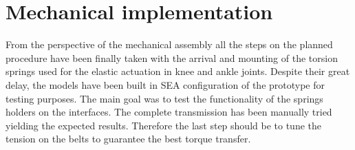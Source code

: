 \section{Mechanical implementation} %
\label{sec:mechanical_implementation}
From the perspective of the mechanical assembly all the steps on the planned procedure have been finally taken with the arrival and mounting of the torsion springs used for the elastic actuation in knee and ankle joints. 
Despite their great delay, the models 
have been built in SEA configuration of the prototype for testing purposes.
The main goal was to test the functionality of the springs holders on the interfaces. 
The complete transmission has been manually tried yielding the expected results. 
Therefore the last step should be to tune the tension on the belts to guarantee the best torque transfer.

